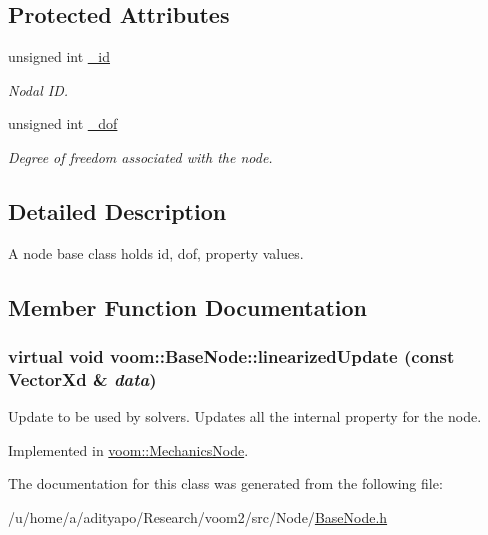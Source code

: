 \subsection*{Protected Attributes}
\begin{DoxyCompactItemize}
\item 
\hypertarget{classvoom_1_1_base_node_a8681fcdb44184fa22d54c14403b0716a}{
unsigned int \hyperlink{classvoom_1_1_base_node_a8681fcdb44184fa22d54c14403b0716a}{\_\-id}}
\label{classvoom_1_1_base_node_a8681fcdb44184fa22d54c14403b0716a}

\begin{DoxyCompactList}\small\item\em Nodal ID. \item\end{DoxyCompactList}\item 
\hypertarget{classvoom_1_1_base_node_ac0bca38f9ad3d54960ec7d0776ec71c4}{
unsigned int \hyperlink{classvoom_1_1_base_node_ac0bca38f9ad3d54960ec7d0776ec71c4}{\_\-dof}}
\label{classvoom_1_1_base_node_ac0bca38f9ad3d54960ec7d0776ec71c4}

\begin{DoxyCompactList}\small\item\em Degree of freedom associated with the node. \item\end{DoxyCompactList}\end{DoxyCompactItemize}


\subsection{Detailed Description}
A node base class holds id, dof, property values. 

\subsection{Member Function Documentation}
\hypertarget{classvoom_1_1_base_node_a27a440cc623e936472f5052f2731d32f}{
\subsubsection[{linearizedUpdate}]{\setlength{\rightskip}{0pt plus 5cm}virtual void voom::BaseNode::linearizedUpdate (const VectorXd \& {\em data})}}
\label{classvoom_1_1_base_node_a27a440cc623e936472f5052f2731d32f}
Update to be used by solvers. Updates all the internal property for the node. 

Implemented in \hyperlink{classvoom_1_1_mechanics_node_aa533aac405cd9f4b8b024ad070f18aff}{voom::MechanicsNode}.

The documentation for this class was generated from the following file:\begin{DoxyCompactItemize}
\item 
/u/home/a/adityapo/Research/voom2/src/Node/\hyperlink{_base_node_8h}{BaseNode.h}\end{DoxyCompactItemize}
